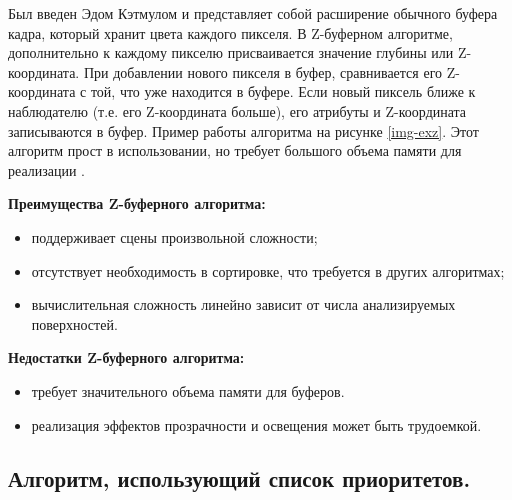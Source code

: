 Был введен Эдом Кэтмулом и представляет собой расширение обычного буфера кадра, который хранит цвета каждого пикселя. В Z-буферном алгоритме, дополнительно к каждому пикселю присваивается значение глубины или Z-координата. При добавлении нового пикселя в буфер, сравнивается его Z-координата с той, что уже находится в буфере. Если новый пиксель ближе к наблюдателю (т.е. его Z-координата больше), его атрибуты и Z-координата записываются в буфер. Пример работы алгоритма на рисунке \ref{img-exz}. Этот алгоритм прост в использовании, но требует большого объема памяти для реализации \cite{del_line}. 


\textbf{Преимущества Z-буферного алгоритма:}
\begin{itemize}
\item поддерживает сцены произвольной сложности;
\item отсутствует необходимость в сортировке, что требуется в других алгоритмах;
\item вычислительная сложность линейно зависит от числа анализируемых поверхностей.
\end{itemize}

\textbf{Недостатки Z-буферного алгоритма:}
\begin{itemize}
\item требует значительного объема памяти для буферов.
\item реализация эффектов прозрачности и освещения может быть трудоемкой.
\end{itemize}




\subsection{Алгоритм, использующий список приоритетов.}

